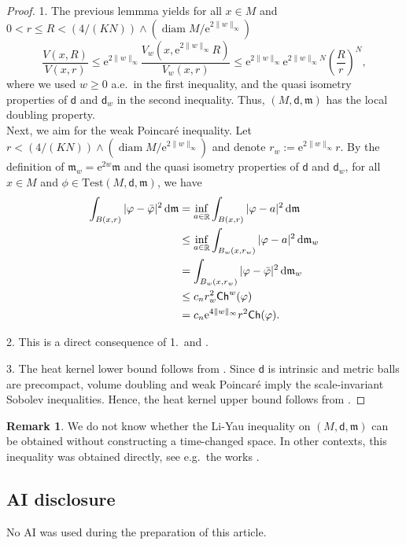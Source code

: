 \documentclass[10pt]{article}
\newcommand{\m}{\mathfrak{m}}
\newcommand{\M}{{\mathit{M}}}
\DeclareMathOperator{\diam}{diam}
\renewcommand{\d}{\,\mathrm{d}}
\newcommand{\Test}{\mathrm{Test}}
\newcommand{\e}{\mathrm{e}}
\newcommand{\dist}{\mathsf{d}}
\newcommand{\Ch}{{\sf Ch}}
\DeclareMathOperator{\RR}{\mathbb{R}}
\theoremstyle{plain}
\theoremstyle{definition}
\newtheorem{remark}[theorem]{Remark}
\begin{document}
\begin{proof}
 1. The previous lemmma yields for all $x\in\M$ and $0<r\leq R<(4/(KN))\wedge (\diam\M/\e^{2\|w\|_\infty})$
    \[
            \frac{V(x,R)}{V(x,r)}
           \leq \e^{2\|w\|_\infty}\frac{V_w(x,\e^{2\|w\|_\infty}R)}{V_w(x,r)}
           \leq \e^{2\|w\|_\infty}\e^{2\|w\|_\infty N}\left(\frac{R}{r}\right)^{N},
        \]
        where we used $w\geq 0$ a.e.~in the first inequality, and the quasi isometry properties of $\dist$ and $\dist_w$ in the second inequality. Thus, $(\M,\dist,\m)$ has the local doubling property. 
        \\
        Next, we aim for the weak Poincar\'e inequality. Let $r<(4/(KN))\wedge (\diam\M/\e^{2\|w\|_\infty})$
        and denote $r_w:=\e^{2\|w\|_\infty}r$. By the definition of $\m_w=\e^{2w}\m$ and the quasi isometry properties of $\dist$ and $\dist_w$, for all $x\in\M$ and $\phi\in\Test(\M,\dist,\m)$, we have
        \begin{align*}
            \int_{B(x,r)}|\varphi -\bar\varphi|^2\d\m
            & =
            \inf_{a\in\RR}\int_{B(x,r)}|\varphi -a|^2\d\m
           \\
           & \leq \inf_{a\in\RR}\int_{B_w(x,r_w)}|\varphi -a|^2\d\m_w\\
           & 
=\int_{B_w(x,r_w)}|\varphi -\bar\varphi|^2\d\m_w
\\
& \leq c_n r_w^2\Ch^w(\varphi)\\
& =c_n\e^{4\|w\|_\infty}r^2\Ch(\varphi).
        \end{align*}
    
2.  This is a direct consequence of 1.~and \cite[Theorem~3.5]{Sturm-96}.

3. The heat kernel lower bound follows from \cite[Theorem~4.8]{Sturm-96}. Since $\dist$ is intrinsic and metric balls are precompact, volume doubling and weak Poincar\'e imply the scale-invariant Sobolev inequalities. Hence, the heat kernel upper bound follows from \cite[Theorem~2.4]{Sturm95_II}.
\end{proof}


\begin{remark} We do not know whether the Li-Yau inequality on $(\M,\dist,\m)$ can be obtained without constructing a time-changed space. In other contexts, this inequality was obtained directly, see e.g.~the works \cite{BaudoinGarofalo,GarofaloMondino-13, BBG17,Rose19,Carron-19}.
\end{remark}

\subsection*{AI disclosure}

No AI was used during the preparation of this article.







\end{document}
